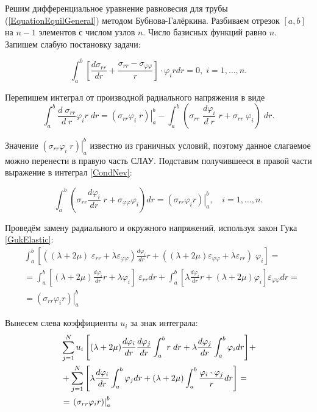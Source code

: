 \documentclass[a4paper,14pt]{extarticle}
\begin{document}
Решим дифференциальное уравнение равновесия для трубы (\ref{EquationEquilGeneral}) методом Бубнова-Галёркина. Разбиваем отрезок $[a,b]$ на $n-1$ элементов с числом узлов $n$. Число базисных функций равно $n$. Запишем слабую постановку задачи:  	

\begin{equation} \label{CondNev}
\int_{a}^{b}{\left[ \frac{d\sigma_{rr}}{dr}+\frac{\sigma_{rr}-\sigma_{\varphi\varphi}}{r} \right]\cdot \varphi_{i}rdr}=0,\; i=1,\ldots,n.
\end{equation}

Перепишем интеграл от производной радиального напряжения в виде
\begin{equation*}
\int_{a}^{b}{\frac{d\;\sigma_{rr}}{d\;r}\varphi_{i}r\;dr}=\left. (\sigma_{rr}\varphi_{i}\;r)\right|_a^b-\int_{a}^{b}{(\sigma_{rr}\;\frac{d\varphi_i}{d\;r}\;r+\sigma_{rr}\;\varphi_i)\;dr}.
\end{equation*}

Значение $\left. (\sigma_{rr}\varphi_{i}\;r)\right|_a^b$ известно из граничных условий, поэтому данное слагаемое можно перенести в правую часть СЛАУ. Подставим получившееся в правой части выражение в интеграл \eqref{CondNev}:

\begin{equation}
\int_a^b{(\sigma_{rr}\frac{d\varphi_i}{d r}\;r+\sigma_{\varphi\varphi}\varphi_i)dr}=\left. (\sigma_{rr}\varphi_{i}r)\right|_a^b,\quad i=1,\ldots,n.
\end{equation}

Проведём замену радиального и окружного напряжений, используя закон Гука \eqref{GukElastic}:
\begin{align*}
&\int_a^b{\left[((\lambda+2\mu)\;\varepsilon_{rr}+\lambda\varepsilon_{\varphi\varphi})\frac{d\varphi_{i}}{d r}r+((\lambda+2\mu)\varepsilon_{\varphi\varphi}+\lambda\varepsilon_{rr})\;\varphi_{i}\right]}=\\
&=\int_a^b{\left[(\lambda+2\mu)\frac{d\varphi_i}{d r}r+\lambda\varphi_i\right]\;\varepsilon_{rr}dr}+\int_a^b{\left[\lambda\frac{d\varphi_i}{d r}r+(\lambda+2\mu)\varphi_i\right]\varepsilon_{\varphi\varphi}dr}=\\
&=\left. (\sigma_{rr}\varphi_{i}r)\right|_a^b
\end{align*}

Вынесем слева коэффициенты $u_i$ за знак интеграла:
\begin{align}\label{FinalEquationStandart}
&\sum_{j=1}^N{u_i\left[(\lambda+2\mu)\frac{d\varphi_i}{d r}\frac{d\varphi_j}{d r}\int_a^b{r\;dr}+\lambda\frac{d\varphi_j}{d r}\int_a^b{\varphi_i dr}\right]}+\notag\\
&+\sum_{j=1}^N{\left[\lambda\frac{d\varphi_i}{d r}\int_a^b{\varphi_j dr}+(\lambda+2\mu)\int_a^b{\frac{\varphi_i \cdot \varphi_j}{r}dr}\right]}=\\
&=\left. (\sigma_{rr}\varphi_{i}r)\right|_a^b\notag
\end{align}
\end{document}
